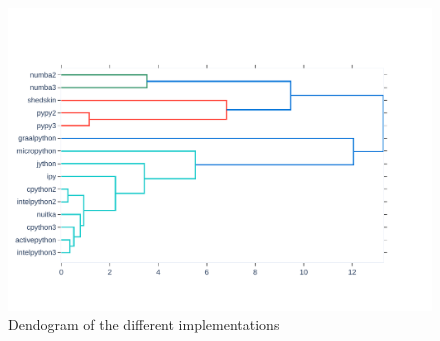 \begin{figure}

\end{figure}
\begin{figure}
    \centering
    \includegraphics[width=\linewidth]{imgs/dendogram_interpreters}
    \caption{Dendogram of the different implementations}
    \label{fig:dendogram}
\end{figure}
